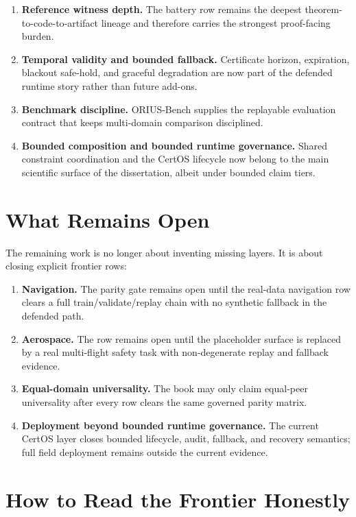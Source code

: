 \begin{enumerate}
  \item \textbf{Reference witness depth.} The battery row remains the deepest
    theorem-to-code-to-artifact lineage and therefore carries the strongest
    proof-facing burden.
  \item \textbf{Temporal validity and bounded fallback.} Certificate horizon,
    expiration, blackout safe-hold, and graceful degradation are now part of
    the defended runtime story rather than future add-ons.
  \item \textbf{Benchmark discipline.} ORIUS-Bench supplies the replayable
    evaluation contract that keeps multi-domain comparison disciplined.
  \item \textbf{Bounded composition and bounded runtime governance.} Shared
    constraint coordination and the CertOS lifecycle now belong to the main
    scientific surface of the dissertation, albeit under bounded claim tiers.
\end{enumerate}

\section{What Remains Open}

The remaining work is no longer about inventing missing layers. It is about
closing explicit frontier rows:

\begin{enumerate}
  \item \textbf{Navigation.} The parity gate remains open until the real-data
    navigation row clears a full train/validate/replay chain with no synthetic
    fallback in the defended path.
  \item \textbf{Aerospace.} The row remains open until the placeholder surface
    is replaced by a real multi-flight safety task with non-degenerate replay
    and fallback evidence.
  \item \textbf{Equal-domain universality.} The book may only claim equal-peer
    universality after every row clears the same governed parity matrix.
  \item \textbf{Deployment beyond bounded runtime governance.} The current
    CertOS layer closes bounded lifecycle, audit, fallback, and recovery
    semantics; full field deployment remains outside the current evidence.
\end{enumerate}

\section{How to Read the Frontier Honestly}

